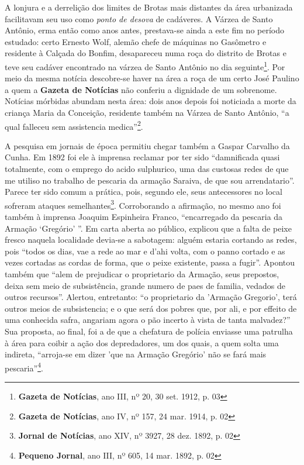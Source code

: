 A lonjura e a derrelição dos limites de Brotas mais distantes da área urbanizada facilitavam seu uso como \textit{ponto de desova} de cadáveres. A Várzea de Santo Antônio, erma então como anos antes, prestava-se ainda a este fim no período estudado: certo Ernesto Wolf, alemão chefe de máquinas no Gasômetro e residente à Calçada do Bonfim, desapareceu numa roça do distrito de Brotas e teve seu cadáver encontrado na várzea de Santo Antônio no dia seguinte\footnote{\textbf{Gazeta de Notícias}, ano III, nº 20, 30 set. 1912, p. 03}. Por meio da mesma notícia descobre-se haver na área a roça de um certo José Paulino a quem a \textbf{Gazeta de Notícias} não conferiu a dignidade de um sobrenome. Notícias mórbidas abundam nesta área: dois anos depois foi noticiada a morte da criança Maria da Conceição, residente também na Várzea de Santo Antônio, ``a qual falleceu sem assistencia medica''\footnote{\textbf{Gazeta de Notícias}, ano IV, nº 157, 24 mar. 1914, p. 02}.

A pesquisa em jornais de época permitiu chegar também a Gaspar Carvalho da Cunha. Em 1892 foi ele à imprensa reclamar por ter sido ``damnificada quasi totalmente, com o emprego do acido sulphurico, uma das custosas redes de que me utiliso no trabalho de pescaria da armação Saraiva, de que sou arrendatario''. Parece ter sido comum a prática, pois, segundo ele, seus antecessores no local sofreram ataques semelhantes\footnote{\textbf{Jornal de Notícias}, ano XIV, nº 3927, 28 dez. 1892, p. 02}. Corroborando a afirmação, no mesmo ano foi também à imprensa Joaquim Espinheira Franco, ``encarregado da pescaria da Armação `Gregório' ''. Em carta aberta ao público, explicou que a falta de peixe fresco naquela localidade devia-se a sabotagem: alguém estaria cortando as redes, pois ``todos os dias, vae a rede ao mar e d'ahi volta, com o panno cortado e as vezes cortadas as cordas de forma, que o peixe existente, passa a fugir''. Apontou também que ``alem de prejudicar o proprietario da Armação, seus prepostos, deixa sem meio de subsistência, grande numero de paes de familia, vedados de outros recursos''. Alertou, entretanto: ``o proprietario da 'Armação Gregorio', terá outros meios de subsistencia; e o que será dos pobres que, por ali, e por effeito de uma conhecida safra, angariam agora o pão incerto à vista de tanta malvadez?'' Sua proposta, ao final, foi a de que a chefatura de polícia enviasse uma patrulha à área para coibir a ação dos depredadores, um dos quais, a quem solta uma indireta, ``arroja-se em dizer 'que na Armação Gregório' não se fará mais pescaria''\footnote{\textbf{Pequeno Jornal}, ano III, nº 605, 14 mar. 1892, p. 02}.




